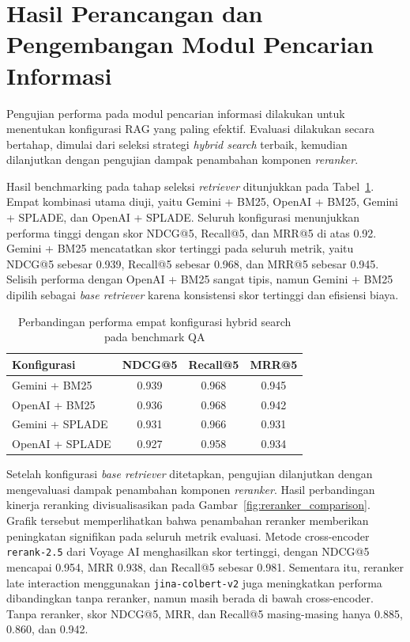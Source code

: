 \section{Hasil Perancangan dan Pengembangan Modul Pencarian Informasi}
Pengujian performa pada modul pencarian informasi dilakukan untuk menentukan konfigurasi RAG yang paling efektif. Evaluasi dilakukan secara bertahap, dimulai dari seleksi strategi \textit{hybrid search} terbaik, kemudian dilanjutkan dengan pengujian dampak penambahan komponen \textit{reranker}.

Hasil benchmarking pada tahap seleksi \textit{retriever} ditunjukkan pada Tabel~\ref{tab:retrieval_benchmark}. Empat kombinasi utama diuji, yaitu Gemini + BM25, OpenAI + BM25, Gemini + SPLADE, dan OpenAI + SPLADE. Seluruh konfigurasi menunjukkan performa tinggi dengan skor NDCG@5, Recall@5, dan MRR@5 di atas 0.92. Gemini + BM25 mencatatkan skor tertinggi pada seluruh metrik, yaitu NDCG@5 sebesar 0.939, Recall@5 sebesar 0.968, dan MRR@5 sebesar 0.945. Selisih performa dengan OpenAI + BM25 sangat tipis, namun Gemini + BM25 dipilih sebagai \textit{base retriever} karena konsistensi skor tertinggi dan efisiensi biaya.

\begin{table}[H]
    \centering
    \caption{Perbandingan performa empat konfigurasi hybrid search pada benchmark QA}
    \label{tab:retrieval_benchmark}
    \small
    \begin{tabular}{|l|c|c|c|}
        \hline
        \textbf{Konfigurasi} & \textbf{NDCG@5} & \textbf{Recall@5} & \textbf{MRR@5} \\ \hline
        Gemini + BM25 & 0.939 & 0.968 & 0.945 \\ \hline
        OpenAI + BM25 & 0.936 & 0.968 & 0.942 \\ \hline
        Gemini + SPLADE & 0.931 & 0.966 & 0.931 \\ \hline
        OpenAI + SPLADE & 0.927 & 0.958 & 0.934 \\ \hline
    \end{tabular}
\end{table}

Setelah konfigurasi \textit{base retriever} ditetapkan, pengujian dilanjutkan dengan mengevaluasi dampak penambahan komponen \textit{reranker}. Hasil perbandingan kinerja reranking divisualisasikan pada Gambar~\ref{fig:reranker_comparison}. Grafik tersebut memperlihatkan bahwa penambahan reranker memberikan peningkatan signifikan pada seluruh metrik evaluasi. Metode cross-encoder \texttt{rerank-2.5} dari Voyage AI menghasilkan skor tertinggi, dengan NDCG@5 mencapai 0.954, MRR 0.938, dan Recall@5 sebesar 0.981. Sementara itu, reranker late interaction menggunakan \texttt{jina-colbert-v2} juga meningkatkan performa dibandingkan tanpa reranker, namun masih berada di bawah cross-encoder. Tanpa reranker, skor NDCG@5, MRR, dan Recall@5 masing-masing hanya 0.885, 0.860, dan 0.942.

